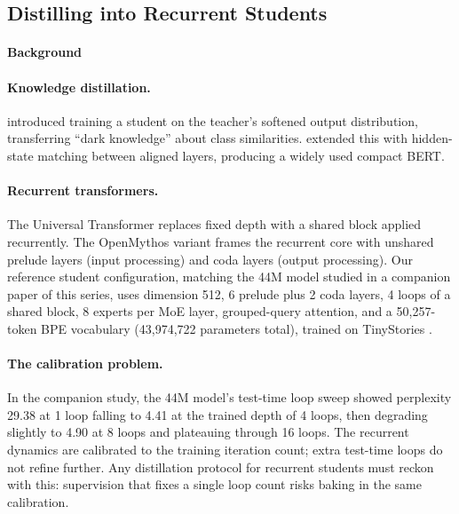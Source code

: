\subsection{Distilling into Recurrent Students}
\label{ch-distill}

\paragraph{Background}

\paragraph{Knowledge distillation.} \citet{hinton2015distilling}
introduced training a student on the teacher's softened output
distribution, transferring ``dark knowledge'' about class similarities.
\citet{sanh2019distilbert} extended this with hidden-state matching
between aligned layers, producing a widely used compact BERT.

\paragraph{Recurrent transformers.} The Universal Transformer
\citep{dehghani2019universal} replaces fixed depth with a shared block
applied recurrently. The OpenMythos variant frames the recurrent core
with unshared prelude layers (input processing) and coda layers
(output processing). Our reference student configuration, matching the
44M model studied in a companion paper of this series, uses dimension
512, 6 prelude plus 2 coda layers, 4 loops of a shared block, 8 experts
per MoE layer, grouped-query attention, and a 50,257-token BPE
vocabulary (43,974,722 parameters total), trained on TinyStories
\citep{eldan2023tinystories}.

\paragraph{The calibration problem.} In the companion study, the 44M
model's test-time loop sweep showed perplexity 29.38 at 1 loop falling
to 4.41 at the trained depth of 4 loops, then degrading slightly to
4.90 at 8 loops and plateauing through 16 loops. The recurrent dynamics
are calibrated to the training iteration count; extra test-time loops
do not refine further. Any distillation protocol for recurrent students
must reckon with this: supervision that fixes a single loop count
risks baking in the same calibration.

